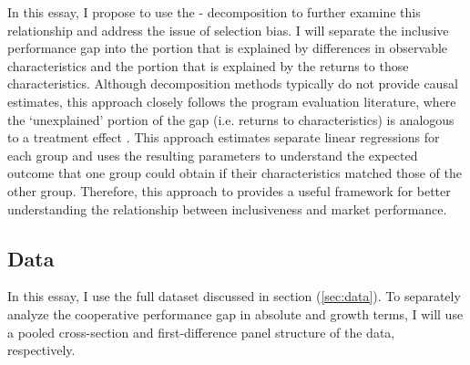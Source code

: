 \documentclass[11pt]{article}
\begin{document}
In this essay, I propose to use the \citet{oaxaca73}-\citet{blinder73} decomposition to further examine this relationship and address the issue of selection bias. I will separate the inclusive performance gap into the portion that is explained by differences in observable characteristics and the portion that is explained by the returns to those characteristics. Although decomposition methods typically do not provide causal estimates, this approach closely follows the program evaluation literature, where the `unexplained' portion of the gap (i.e. returns to characteristics) is analogous to a treatment effect \citep{fortin-et.al.11}. This approach estimates separate linear regressions for each group and uses the resulting parameters to understand the expected outcome that one group could obtain if their characteristics matched those of the other group. Therefore, this approach to  provides a useful framework for better understanding the relationship between inclusiveness and market performance. %

\subsection{Data} \label{sec:E1_data}

In this essay, I use the full dataset discussed in section (\ref{sec:data}). To separately analyze the cooperative performance gap in absolute and growth terms, I will use a pooled cross-section and first-difference panel structure of the data, respectively. 
\end{document}
